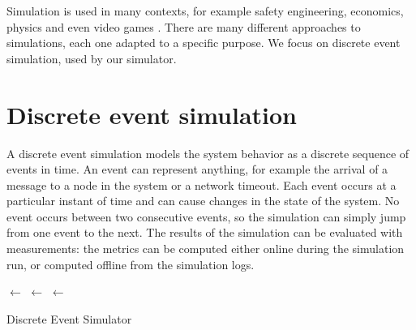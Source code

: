 \medskip
Simulation is used in many contexts, for example safety engineering, economics, physics and even video games \cite{wikipedia_simulation}.
There are many different approaches to simulations, each one adapted to a specific purpose.
We focus on discrete event simulation, used by our simulator.


\section{Discrete event simulation}
A discrete event simulation models the system behavior as a discrete sequence of events in time.
An event can represent anything, for example the arrival of a message to a node in the system or a network timeout.
Each event occurs at a particular instant of time and can cause changes in the state of the system.
No event occurs between two consecutive events, so the simulation can simply jump from one event to the next.
The results of the simulation can be evaluated with measurements:
the metrics can be computed either online during the simulation run, or computed offline from the simulation logs.

\medskip
\begin{algorithm}[h]
	\DontPrintSemicolon


	\BlankLine
	 \;
	\State $\leftarrow$ \InitializeState{} \;
	\Events $\leftarrow$ \InitializeEvents{} \;
	\Queue $\leftarrow$ \New \PriorityQueue{\Events} \;

	\BlankLine
	\BlankLine
	 \;
	\BlankLine

	\caption{Discrete Event Simulator}
	\label{alg:des}
\end{algorithm}
\smallskip

